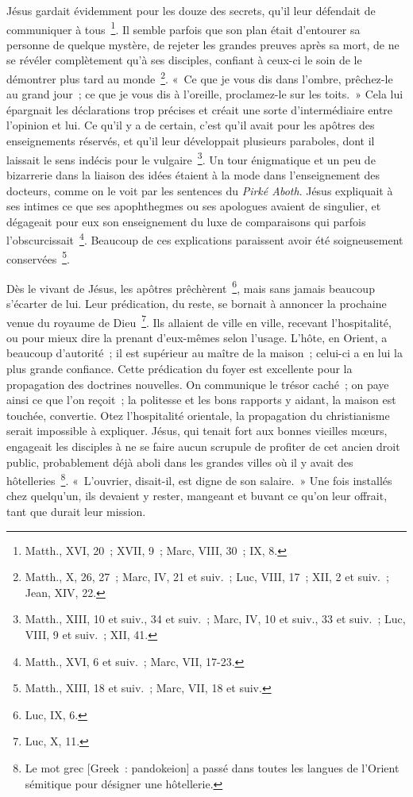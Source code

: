 \documentclass[french,twoside]{book} %
\begin{document}
Jésus gardait évidemment pour les douze des secrets, qu’il leur défendait de communiquer à tous \footnote{Matth., XVI, 20 ; XVII, 9 ; Marc, VIII, 30 ; IX, 8.}. Il semble parfois que son plan était d’entourer sa personne de quelque mystère, de rejeter les grandes preuves après sa mort, de ne se révéler complètement qu’à ses disciples, confiant à ceux-ci le soin de le démontrer plus tard au monde \footnote{Matth., X, 26, 27 ; Marc, IV, 21 et suiv. ; Luc, VIII, 17 ; XII, 2 et suiv. ; Jean, XIV, 22.}. « Ce que je vous dis dans l’ombre, prêchez-le au grand jour ; ce que je vous dis à l’oreille, proclamez-le sur les toits. » Cela lui épargnait les déclarations trop précises et créait une sorte d’intermédiaire entre l’opinion et lui. Ce qu’il y a de certain, c’est qu’il avait pour les apôtres des enseignements réservés, et qu’il leur développait plusieurs paraboles, dont il laissait le sens indécis pour le vulgaire \footnote{Matth., XIII, 10 et suiv., 34 et suiv. ; Marc, IV, 10 et suiv., 33 et suiv. ; Luc, VIII, 9 et suiv. ; XII, 41.}. Un tour énigmatique et un peu de bizarrerie dans la liaison des idées étaient à la mode dans l’enseignement des docteurs, comme on le voit par les sentences du {\itshape Pirké Aboth}. Jésus expliquait à ses intimes ce que ses apophthegmes ou ses apologues avaient de singulier, et dégageait pour eux son enseignement du luxe de comparaisons qui parfois l’obscurcissait \footnote{Matth., XVI, 6 et suiv. ; Marc, VII, 17-23.}. Beaucoup de ces explications paraissent avoir été soigneusement conservées \footnote{Matth., XIII, 18 et suiv. ; Marc, VII, 18 et suiv.}.\par
Dès le vivant de Jésus, les apôtres prêchèrent \footnote{Luc, IX, 6.}, mais sans jamais beaucoup s’écarter de lui. Leur prédication, du reste, se bornait à annoncer la prochaine venue du royaume de Dieu \footnote{Luc, X, 11.}. Ils allaient de ville en ville, recevant l’hospitalité, ou pour mieux dire la prenant d’eux-mêmes selon l’usage. L’hôte, en Orient, a beaucoup d’autorité ; il est supérieur au maître de la maison ; celui-ci a en lui la plus grande confiance. Cette prédication du foyer est excellente pour la propagation des doctrines nouvelles. On communique le trésor caché ; on paye ainsi ce que l’on reçoit ; la politesse et les bons rapports y aidant, la maison est touchée, convertie. Otez l’hospitalité orientale, la propagation du christianisme serait impossible à expliquer. Jésus, qui tenait fort aux bonnes vieilles mœurs, engageait les disciples à ne se faire aucun scrupule de profiter de cet ancien droit public, probablement déjà aboli dans les grandes villes où il y avait des hôtelleries \footnote{ Le mot grec [Greek : pandokeion] a passé dans toutes les langues de l’Orient sémitique pour désigner une hôtellerie.}. « L’ouvrier, disait-il, est digne de son salaire. » Une fois installés chez quelqu’un, ils devaient y rester, mangeant et buvant ce qu’on leur offrait, tant que durait leur mission.\par
\end{document}
